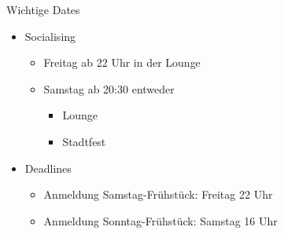 \begin{frame}{Wichtige Dates}
    \begin{itemize}
        \item Socialising
        \begin{itemize}
            \item Freitag ab 22 Uhr in der Lounge
            \item Samstag ab 20:30 entweder
            \begin{itemize}
                \item Lounge
                \item Stadtfest
            \end{itemize}
        \end{itemize}
        \item Deadlines
        \begin{itemize}
            \item Anmeldung Samstag-Frühstück: Freitag 22 Uhr
            \item Anmeldung Sonntag-Frühstück: Samstag 16 Uhr
        \end{itemize}
    \end{itemize}
\end{frame}
